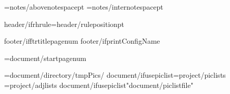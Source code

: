 \AboveNoteSpace={notes/abovenotespace}pt
\InterNoteSpace={notes/internotespace}pt

\def\HeaderPosition{{{header/headerposition}}}
\def\FooterPosition{{{header/footerposition}}}
{header/ifrhrule}\RHruleposition={header/ruleposition}pt
\def\RangeSeparator{{\kern.1em\char"2013\kern.1em}} %
\def\ChapterVerseSeparator{{\kern.02em{header/chvseparator}\kern.02em}} %

\def\RHevenleft{{{header/evenleft}}}
\def\RHevencenter{{{header/evencenter}}}
\def\RHevenright{{{header/evenright}}}

\def\RHoddleft{{{header/oddleft}}}
\def\RHoddcenter{{{header/oddcenter}}}
\def\RHoddright{{{header/oddright}}}

\def\RHnoVevenleft{{{header/noVevenleft}}}
\def\RHnoVevencenter{{{header/noVevencenter}}}
\def\RHnoVevenright{{{header/noVevenright}}}

\def\RHnoVoddleft{{{header/noVoddleft}}}
\def\RHnoVoddcenter{{{header/noVoddcenter}}}
\def\RHnoVoddright{{{header/noVoddright}}}


\def\RFoddcenter{{{footer/oddcenter}}}
\def\RFevencenter{{{footer/oddcenter}}}
\def\RFtitlecenter{{{footer/oddcenter}}}

{footer/ifftrtitlepagenum}\def\RFtitlecenter{{\pagenumber}}
{footer/ifprintConfigName}\def\RFtitlecenter{{{config/name}}}

\pageno={document/startpagenum}

\PicPath={{{document/directory}/tmpPics/}}
{document/ifusepiclist}\PicListPath={{{project/piclists}}}
\AdjListPath={{{project/adjlists}}}
{document/ifusepiclist}\openpiclist "{document/piclistfile}"

\def\b{{\par\vskip\baselineskip}}
\let\pb=\pagebreak

